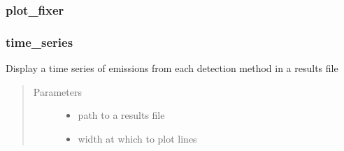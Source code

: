 \documentclass[letterpaper,10pt,english]{sphinxmanual}
\begin{document}
\subsubsection{plot\_fixer}
\label{\detokenize{index:plot-fixer}}

\begin{fulllineitems}
\label{\detokenize{index:feast.ResultsProcessing.plotting_functions.plot_fixer}}
\end{fulllineitems}



\subsubsection{time\_series}
\label{\detokenize{index:time-series}}

\begin{fulllineitems}
\label{\detokenize{index:feast.ResultsProcessing.plotting_functions.time_series}}
Display a time series of emissions from each detection method in a results file
\begin{quote}\begin{description}
\item[{Parameters}] \leavevmode\begin{itemize}
\item {} 
 \textendash{} path to a results file

\item {} 
 \textendash{} width at which to plot lines

\end{itemize}

\end{description}\end{quote}

\end{fulllineitems}
\end{document}
